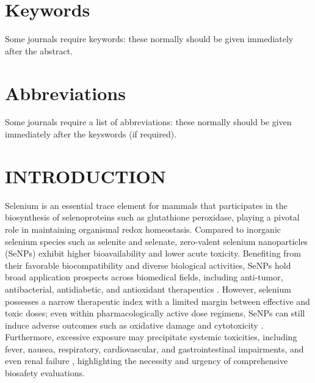 \documentclass[letterpaper]{article}
\begin{document}
\begin{abstract}
This investigation demonstrates that relying exclusively on generic physicochemical descriptors is insufficient for nanotoxicity prediction within single-material systems; instead, enhanced features capturing intrinsic chemical attributes offer essential complementary value. The data curation, feature characterization, and modeling workflows established herein provide a methodological foundation for developing selenium nanoparticle toxicity prediction platforms, prioritizing laboratory screening candidates, and guiding subsequent external validation studies, while findings incorporating IC50 require cautious interpretation tailored to realistic prospective prediction scenarios.

\end{abstract}

\section*{Keywords}

Some journals require keywords: these normally should be given immediately
after the abstract.

\section*{Abbreviations}

Some journals require a list of abbreviations: these normally should be given
immediately after the keyswords (if required).

\section{INTRODUCTION}

Selenium is an essential trace element for mammals that participates in the biosynthesis of selenoproteins such as glutathione peroxidase, playing a pivotal role in maintaining organismal redox homeostasis. Compared to inorganic selenium species such as selenite and selenate, zero-valent selenium nanoparticles (SeNPs) exhibit higher bioavailability and lower acute toxicity. Benefiting from their favorable biocompatibility and diverse biological activities, SeNPs hold broad application prospects across biomedical fields, including anti-tumor, antibacterial, antidiabetic, and antioxidant therapeutics \cite{hosnedlova2018nanoselenium,bisht2022senps,sowmya2024nanoselenium,karthik2024senps}. However, selenium possesses a narrow therapeutic index with a limited margin between effective and toxic doses; even within pharmacologically active dose regimens, SeNPs can still induce adverse outcomes such as oxidative damage and cytotoxicity \cite{wang2020prooxidation}. Furthermore, excessive exposure may precipitate systemic toxicities, including fever, nausea, respiratory, cardiovascular, and gastrointestinal impairments, and even renal failure \cite{hosnedlova2018nanoselenium}, highlighting the necessity and urgency of comprehensive biosafety evaluations.
\end{document}
